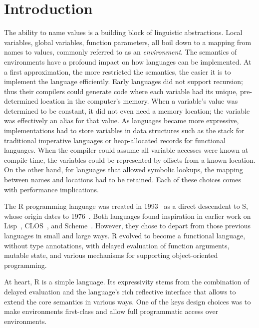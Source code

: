 \documentclass[sigplan,screen]{acmart}
\begin{document}
\maketitle
\section{Introduction}

The ability to name values is a building block of linguistic abstractions. Local
variables, global variables, function parameters, all boil down to a mapping
from names to values, commonly referred to as an \emph{environment}. The
semantics of environments have a profound impact on how languages can be
implemented. At a first approximation, the more restricted the semantics, the
easier it is to implement the language efficiently. Early languages did not
support recursion; thus their compilers could generate code where each variable
had its unique, pre-determined location in the computer's memory. When a
variable's value was determined to be constant, it did not even need a memory
location; the variable was effectively an alias for that value. As languages
became more expressive, implementations had to store variables in data
structures such as the stack for traditional imperative languages or
heap-allocated records for functional languages. When the compiler could assume
all variable accesses were known at compile-time, the variables could be
represented by offsets from a known location. On the other hand, for
languages that allowed symbolic lookups, the mapping between names and locations
had to be retained. Each of these choices comes with performance implications.

The R programming language was created in 1993~\cite{r96} as a direct descendent
to S, whose origin dates to 1976~\cite{s88}. Both languages found inspiration in
earlier work on Lisp~\cite{Lisp}, CLOS~\cite{CLOS}, and
Scheme~\cite{SchemeR5RS}. However, they chose to depart from those previous
languages in small and large ways. R evolved to become a functional language,
without type annotations, with delayed evaluation of function arguments, mutable
state, and various mechanisms for supporting object-oriented programming.

At heart, R is a simple language. Its expressivity stems from the combination of
delayed evaluation and the language's rich reflective interface that allows to
extend the core semantics in various ways. One of the keys design choices was to
make environments first-class and allow full programmatic access over
environments.
\end{document}
